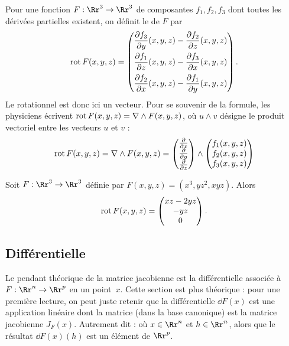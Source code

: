 \documentclass[11pt, class=report,crop=false]{standalone}
\begin{document}
\bigskip
\bigskip


Pour une fonction  $F : \Rr^3 \to \Rr^3$ de composantes $f_1,f_2,f_3$ dont toutes les dérivées partielles existent, on d\'efinit le  de $F$ par
$$\operatorname{rot} F (x,y,z)=
\begin{pmatrix}
    \dfrac{\partial f_3}{\partial y}(x,y,z)-\dfrac{\partial f_2}{\partial z}(x,y,z) \\[2ex]
    \dfrac{\partial f_1}{\partial z}(x,y,z)-\dfrac{\partial f_3}{\partial x}(x,y,z) \\[2ex]
    \dfrac{\partial f_2}{\partial x}(x,y,z)-\dfrac{\partial f_1}{\partial y}(x,y,z)
\end{pmatrix}.
$$
Le rotationnel est donc ici un vecteur.
Pour se souvenir de la formule, les physiciens  écrivent $\operatorname{rot} F (x,y,z) =  \nabla \wedge F(x,y,z)$,
  où $u \wedge v$ désigne le produit vectoriel entre les vecteurs $u$ et $v$ :
$$\operatorname{rot} F (x,y,z)=  \nabla \wedge F(x,y,z)
= 
\begin{pmatrix}
\frac{\partial}{\partial x}\\
\frac{\partial}{\partial y}\\
\frac{\partial}{\partial z}\\
\end{pmatrix}
\wedge 
\begin{pmatrix}
f_1(x,y,z) \\
f_2(x,y,z) \\
f_3(x,y,z) \\
\end{pmatrix}
$$

\begin{exemple}
Soit $F : \Rr^3 \to \Rr^3$ définie par $F(x,y,z) = (x^3, yz^2, xyz)$. Alors
$$\operatorname{rot} F (x,y,z) = \begin{pmatrix} xz -2yz \\ - yz \\ 0 \end{pmatrix}.$$
\end{exemple}



\subsection{Différentielle}


Le pendant théorique de la matrice jacobienne est la différentielle associée à $F : \Rr^n \to \Rr^p$ en un point~$x$. Cette section est plus théorique : pour une première lecture, on peut juste retenir que la différentielle $\dd F(x)$ est une application linéaire dont la matrice (dans la base canonique) est la matrice jacobienne $J_F(x)$. Autrement dit :
où $x \in \Rr^n$ et $h\in \Rr^n$, alors que le résultat $\dd F(x) (h)$ est un élément de $\Rr^p$.
\end{document}
